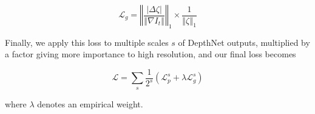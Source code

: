 \documentclass[runningheads]{llncs}
\begin{document}
\begin{equation}
\mathcal{L}_g = \left\Vert\frac{|\Delta \zeta|}{\left\Vert\nabla I_t\right\Vert}\right\Vert_1 \times \frac{1}{\left\Vert \zeta \right\Vert_1}
\end{equation}


Finally, we apply this loss to multiple scales $s$ of DepthNet outputs, multiplied by a factor giving more importance to high resolution, and our final loss becomes

\begin{equation}
\mathcal{L} = \sum_s \frac{1}{2^s} \left(\mathcal{L}_p^s + \lambda\mathcal{L}_g^s \right)
\end{equation}

where $\lambda$ denotes an empirical weight.


\end{document}
